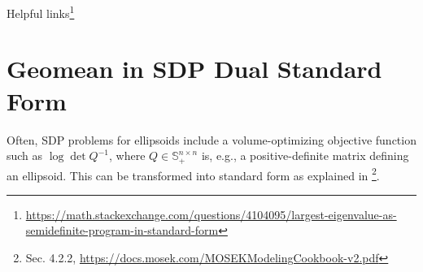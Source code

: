 \documentclass{article}
\newcommand{\inv}[1]{#1^{-1}}
\begin{document}
		Helpful links\footnote{\url{https://math.stackexchange.com/questions/4104095/largest-eigenvalue-as-semidefinite-program-in-standard-form}}
		
	\section{Geomean in SDP Dual Standard Form}
	Often, SDP problems for ellipsoids include a volume-optimizing objective function such as $\log\det \inv{Q}$, where $Q\in\mathbb{S}_+^{n\times n}$ is, e.g., a positive-definite matrix defining an ellipsoid. This can be transformed into standard form as explained in \footnote{Sec. 4.2.2, \url{https://docs.mosek.com/MOSEKModelingCookbook-v2.pdf}}.
\end{document}
